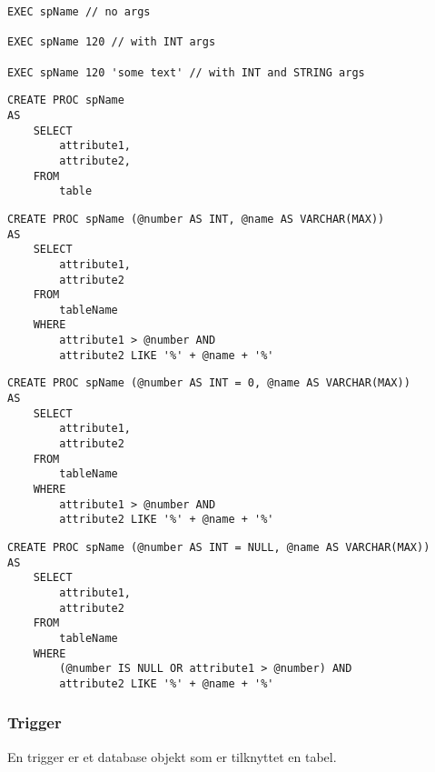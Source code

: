 \begin{lstlisting}[caption=Kald af Stored Procedure.]
EXEC spName // no args

EXEC spName 120 // with INT args

EXEC spName 120 'some text' // with INT and STRING args
\end{lstlisting}

\begin{lstlisting}[caption=Eksempel på Stored Procedure uden parametre.]
CREATE PROC spName
AS 
	SELECT
		attribute1, 
		attribute2,
	FROM
		table
\end{lstlisting}

\begin{lstlisting}[caption=Eksempel på Stored Procedure med parametre.]
CREATE PROC spName (@number AS INT, @name AS VARCHAR(MAX))
AS 
	SELECT
		attribute1,
		attribute2
	FROM
		tableName
	WHERE
		attribute1 > @number AND
		attribute2 LIKE '%' + @name + '%'
\end{lstlisting}

\begin{lstlisting}[caption=Eksempel på Stored Procedure med 'optionel' parametre.]
CREATE PROC spName (@number AS INT = 0, @name AS VARCHAR(MAX))
AS 
	SELECT
		attribute1,
		attribute2
	FROM
		tableName
	WHERE
		attribute1 > @number AND
		attribute2 LIKE '%' + @name + '%'
\end{lstlisting}

\begin{lstlisting}[caption=Eksempel på Stored Procedure med 'optionel' parametre ('Avanceret').]
CREATE PROC spName (@number AS INT = NULL, @name AS VARCHAR(MAX))
AS 
	SELECT
		attribute1,
		attribute2
	FROM
		tableName
	WHERE
		(@number IS NULL OR attribute1 > @number) AND
		attribute2 LIKE '%' + @name + '%'
\end{lstlisting}

\subsubsection{Trigger}
En trigger er et database objekt som er tilknyttet en tabel.

